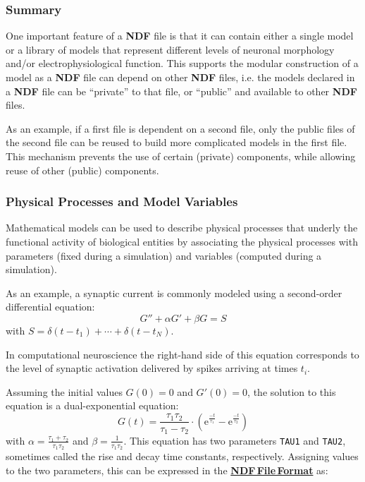 \documentclass[12pt]{article}
\begin{document}
\subsubsection*{Summary}
One important feature of a {\bf NDF} file is that it can contain
either a single model or a library of models that represent different
levels of neuronal morphology and/or electrophysiological function.
This supports the modular construction of a model as a {\bf NDF} file
can depend on other {\bf NDF} files, i.e. the models declared in a
{\bf NDF} file can be ``private'' to that file, or ``public'' and
available to other {\bf NDF} files.

As an example, if a first file is dependent on a second file, only the
public files of the second file can be reused to build more
complicated models in the first file. This mechanism prevents the use
of certain (private) components, while allowing reuse of other
(public) components.


\subsubsection*{Physical Processes and Model Variables}

Mathematical models can be used to describe physical processes that underly the functional activity
of biological entities by associating the physical
processes with parameters (fixed during a simulation) and variables
(computed during a simulation).

As an example, a synaptic current is commonly modeled using a
second-order differential equation:
\begin{equation}
  \label{eq:second-order-synchan}
  G'' + \alpha G' + \beta G = S
\end{equation}
with $S = \delta(t - t_1) + \cdots + \delta(t - t_N)$.

In computational neuroscience the right-hand side of this equation
corresponds to the level of synaptic activation delivered by spikes
arriving at times $t_i$.

Assuming the initial values $G(0) = 0$ and $G'(0) = 0$, the solution
to this equation is a dual-exponential equation:
\begin{equation}
  \label{eq:dual-exponential}
  G(t) = \frac{\tau_1\tau_2}{\tau_1 - \tau_2}
  \cdot (\mathrm{e}^{\frac{-t}{\tau_1}} - \mathrm{e}^{\frac{-t}{\tau_2}})
\end{equation}
with $\alpha = \frac{\tau_1 + \tau_2}{\tau_1 \tau_2}$ and $\beta =
\frac{1}{\tau_1 \tau_2}$.
This equation has two parameters {\tt TAU1} and {\tt TAU2}, sometimes
called the rise and decay time constants, respectively.  Assigning
values to the two parameters, this can be expressed in the \href{../ndf-file-format/ndf-file-format.tex}{\bf NDF\,File\,Format}
as:
\end{document}
